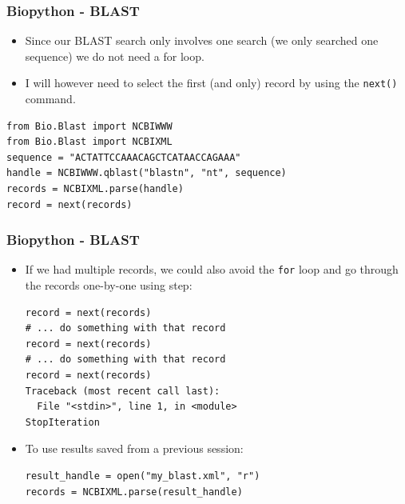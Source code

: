 \documentclass[xcolor=svgnames, handout]{beamer}
\newcommand{\ft}[1]{\frametitle{#1}}
\begin{document}
\begin{frame}[fragile]\ft{Biopython - BLAST}
\begin{itemize}
\item Since our BLAST search only involves one search (we only searched one sequence)  we do not need a for loop. 
\item I will however need to select the first (and only) record by using the {\tt next()} command.
\end{itemize}
 \begin{Verbatim}[frame=single, xleftmargin=0.2in]
from Bio.Blast import NCBIWWW
from Bio.Blast import NCBIXML
sequence = "ACTATTCCAAACAGCTCATAACCAGAAA"
handle = NCBIWWW.qblast("blastn", "nt", sequence)
records = NCBIXML.parse(handle)
record = next(records)
 \end{Verbatim}
\end{frame}


\begin{frame}[fragile]\ft{Biopython - BLAST}
\begin{itemize}
\item If we had multiple records, we could also avoid the {\tt for} loop and go through the records one-by-one using step:

\begin{Verbatim}[xleftmargin=.2in, frame=single]
record = next(records)
# ... do something with that record
record = next(records)
# ... do something with that record
record = next(records)
Traceback (most recent call last):
  File "<stdin>", line 1, in <module>
StopIteration
\end{Verbatim}
\item  To use results saved from a previous session:
\begin{Verbatim}[frame=single]
result_handle = open("my_blast.xml", "r") 
records = NCBIXML.parse(result_handle)
\end{Verbatim}

\end{itemize}
\end{frame}
\end{document}
